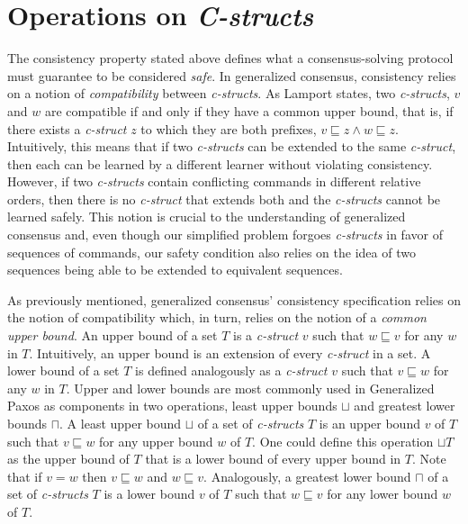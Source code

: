 \section{Operations on \textit{C-structs}} \label{Operations}
The consistency property stated above defines what a consensus-solving protocol must guarantee to be considered \textit{safe}. In generalized consensus, consistency relies on a notion of \textit{compatibility} between \textit{c-structs}. As Lamport states, two \textit{c-structs}, $v$ and $w$ are compatible if and only if they have a common upper bound, that is, if there exists a \textit{c-struct} $z$ to which they are both prefixes, $v \sqsubseteq z \land w \sqsubseteq z$. Intuitively, this means that if two \textit{c-structs} can be extended to the same \textit{c-struct}, then each can be learned by a different learner without violating consistency. However, if two \textit{c-structs} contain conflicting commands in different relative orders, then there is no \textit{c-struct} that extends both and the \textit{c-structs} cannot be learned safely. This notion is crucial to the understanding of generalized consensus and, even though our simplified problem forgoes \textit{c-structs} in favor of sequences of commands, our safety condition also relies on the idea of two sequences being able to be extended to equivalent sequences.\par
As previously mentioned, generalized consensus' consistency specification relies on the notion of compatibility which, in turn, relies on the notion of a \textit{common upper bound}. An upper bound of a set $T$ is a \textit{c-struct} $v$ such that $w \sqsubseteq v$ for any $w$ in $T$. Intuitively, an upper bound is an extension of every \textit{c-struct} in a set. A lower bound of a set $T$ is defined analogously as a \textit{c-struct} $v$ such that $v \sqsubseteq w$ for any $w$ in $T$. Upper and lower bounds are most commonly used in Generalized Paxos as components in two operations, least upper bounds $\sqcup$ and greatest lower bounds $\sqcap$. A least upper bound $\sqcup$ of a set of \textit{c-structs} $T$ is an upper bound $v$ of $T$ such that $v \sqsubseteq w$ for any upper bound $w$ of $T$. One could define this operation $\sqcup T$ as the upper bound of $T$ that is a lower bound of every upper bound in $T$. Note that if $v = w$ then $v\sqsubseteq w$ and $w\sqsubseteq v$. Analogously, a greatest lower bound $\sqcap$ of a set of \textit{c-structs} $T$ is a lower bound $v$ of $T$ such that $w \sqsubseteq v$ for any lower bound $w$ of $T$. \par
